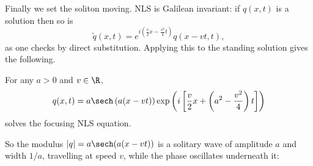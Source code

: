 Finally we set the soliton moving. NLS is Galilean invariant: if $q(x,t)$ is a solution then so is
$$
\tilde q(x,t) = e^{i\left(\frac{v}{2}x - \frac{v^2}{4}t\right)}q(x - vt, t),
$$
as one checks by direct substitution. Applying this to the standing solution gives the following.

\begin{proposition}
	For any $a > 0$ and $v\in\R$,
	$$
	q(x,t) = a\sech\left(a(x-vt)\right)\exp\left(i\left[\frac{v}{2}x + \left(a^2 - \frac{v^2}{4}\right)t\right]\right)
	$$
	solves the focusing NLS equation.
\end{proposition}

So the modulus $|q| = a\sech(a(x-vt))$ is a solitary wave of amplitude $a$ and width $1/a$, travelling at speed $v$, while the phase oscillates underneath it:
\begin{center}
\end{center}
